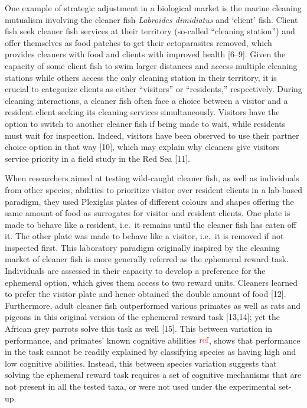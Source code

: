 \documentclass[10pt,letterpaper]{article}
\begin{document}
One example of strategic adjustment in a biological market is the marine
cleaning mutualism involving the cleaner fish \emph{Labroides
dimidiatus} and `client' fish. Client fish seek cleaner fish services at
their territory (so-called ``cleaning station'') and offer themselves as
food patches to get their ectoparasites removed, which provides cleaners
with food and clients with improved health {[}6--9{]}. Given the
capacity of some client fish to swim larger distances and access
multiple cleaning stations while others access the only cleaning station
in their territory, it is crucial to categorize clients as either
``visitors'' or ``residents,'' respectively. During cleaning
interactions, a cleaner fish often face a choice between a visitor and a
resident client seeking its cleaning services simultaneously. Visitors
have the option to switch to another cleaner fish if being made to wait,
while residents must wait for inspection. Indeed, visitors have been
observed to use their partner choice option in that way {[}10{]}, which
may explain why cleaners give visitors service priority in a field study
in the Red Sea {[}11{]}.

When researchers aimed at testing wild-caught cleaner fish, as well as
individuals from other species, abilities to prioritize visitor over
resident clients in a lab-based paradigm, they used Plexiglas plates of
different colours and shapes offering the same amount of food as
surrogates for visitor and resident clients. One plate is made to behave
like a resident, i.e.~it remains until the cleaner fish has eaten off
it. The other plate was made to behave like a visitor, i.e.~it is
removed if not inspected first. This laboratory paradigm originally
inspired by the cleaning market of cleaner fish is more generally
referred as the ephemeral reward task. Individuals are assessed in their
capacity to develop a preference for the ephemeral option, which gives
them access to two reward units. Cleaners learned to prefer the visitor
plate and hence obtained the double amount of food {[}12{]}.
Furthermore, adult cleaner fish outperformed various primates as well as
rats and pigeons in this original version of the ephemeral reward task
{[}13,14{]}; yet the African grey parrots solve this task as well
{[}15{]}. This between variation in performance, and primates' known
cognitive abilities \(\color{red}{\text{ref}}\), shows that performance
in the task cannot be readily explained by classifying species as having
high and low cognitive abilities. Instead, this between species
variation suggests that solving the ephemeral reward task requires a set
of cognitive mechanisms that are not present in all the tested taxa, or
were not used under the experimental set-up.
\end{document}
